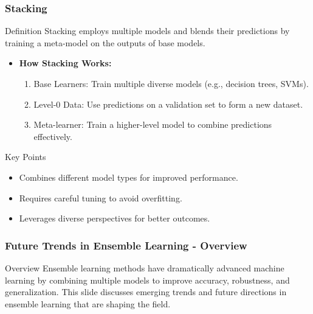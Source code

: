 \documentclass[aspectratio=169]{beamer}
\begin{document}
\begin{frame}[fragile]
    \frametitle{Stacking}
    \begin{block}{Definition}
        Stacking employs multiple models and blends their predictions by training a meta-model on the outputs of base models.
    \end{block}

    \begin{itemize}
        \item \textbf{How Stacking Works:}
            \begin{enumerate}
                \item Base Learners: Train multiple diverse models (e.g., decision trees, SVMs).
                \item Level-0 Data: Use predictions on a validation set to form a new dataset.
                \item Meta-learner: Train a higher-level model to combine predictions effectively.
            \end{enumerate}
    \end{itemize}

    \begin{block}{Key Points}
        \begin{itemize}
            \item Combines different model types for improved performance.
            \item Requires careful tuning to avoid overfitting.
            \item Leverages diverse perspectives for better outcomes.
        \end{itemize}
    \end{block}
\end{frame}

\begin{frame}[fragile]
    \frametitle{Future Trends in Ensemble Learning - Overview}
    \begin{block}{Overview}
        Ensemble learning methods have dramatically advanced machine learning by combining multiple models to improve accuracy, robustness, and generalization. 
        This slide discusses emerging trends and future directions in ensemble learning that are shaping the field.
    \end{block}
\end{frame}
\end{document}
